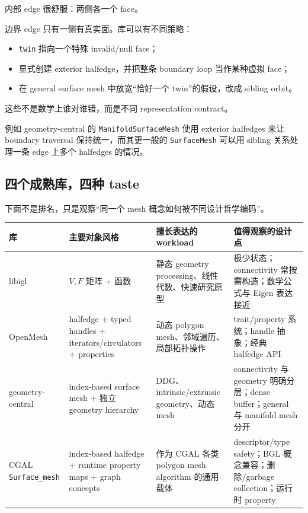 \documentclass[UTF8,11pt]{ctexart}
\newcommand{\code}[1]{\texttt{#1}}
\newcommand{\cgalSurfaceMesh}{\texttt{Surface\_mesh}}
\begin{document}
内部 edge 很舒服：两侧各一个 face。

边界 edge 只有一侧有真实面。库可以有不同策略：

\begin{itemize}
  \item \code{twin} 指向一个特殊 invalid/null face；
  \item 显式创建 exterior halfedge，并把整条 boundary loop 当作某种虚拟 face；
  \item 在 general surface mesh 中放宽“恰好一个 twin”的假设，改成 sibling orbit。
\end{itemize}

这些不是数学上谁对谁错，而是不同 representation contract。

例如 geometry-central 的 \code{ManifoldSurfaceMesh} 使用 exterior halfedges 来让 boundary traversal 保持统一，而其更一般的 \code{SurfaceMesh} 可以用 sibling 关系处理一条 edge 上多个 halfedges 的情况。

\subsection{四个成熟库，四种 taste}

下面不是排名，只是观察“同一个 mesh 概念如何被不同设计哲学编码”。

\begin{center}
\small
\begin{tabular}{p{2.2cm}p{3.4cm}p{4.0cm}p{4.2cm}}
\toprule
库 & 主要对象风格 & 擅长表达的 workload & 值得观察的设计点\\
\midrule
libigl & $V,F$ 矩阵 + 函数 & 静态 geometry processing、线性代数、快速研究原型 & 极少状态；connectivity 常按需构造；数学公式与 Eigen 表达接近\\
\addlinespace
OpenMesh & halfedge + typed handles + iterators/circulators + properties & 动态 polygon mesh、邻域遍历、局部拓扑操作 & trait/property 系统；handle 抽象；经典 halfedge API\\
\addlinespace
geometry-central & index-based surface mesh + 独立 geometry hierarchy & DDG、intrinsic/extrinsic geometry、动态 mesh & connectivity 与 geometry 明确分层；dense buffer；general 与 manifold mesh 分开\\
\addlinespace
CGAL \cgalSurfaceMesh & index-based halfedge + runtime property maps + graph concepts & 作为 CGAL 各类 polygon mesh algorithm 的通用载体 & descriptor/type safety；BGL 概念兼容；删除/garbage collection；运行时 property\\
\bottomrule
\end{tabular}
\end{center}
\end{document}
